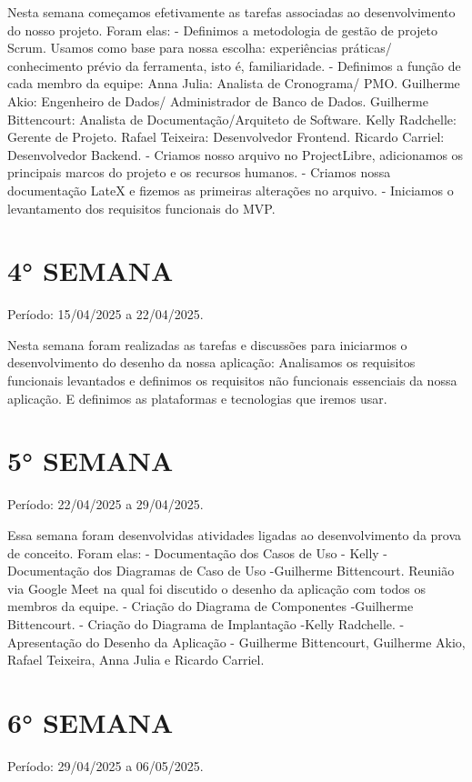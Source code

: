 \documentclass[
	12pt,				%
	openany,			%
	oneside,			%
	a4paper,			%
	english,			%
	french,				%
	spanish,			%
	brazil				%
	]{abntex2}
\begin{document}
\begin{apendicesenv}
Nesta semana começamos efetivamente as tarefas associadas ao desenvolvimento do nosso projeto. Foram elas:
- Definimos a metodologia de gestão de projeto Scrum. Usamos como base para  nossa escolha: experiências práticas/ conhecimento prévio da ferramenta, isto é, familiaridade. 
- Definimos a função de cada membro da equipe:
Anna Julia: Analista de Cronograma/ PMO.
Guilherme Akio: Engenheiro de Dados/ Administrador de Banco de Dados.
Guilherme Bittencourt: Analista de Documentação/Arquiteto de Software.
Kelly Radchelle: Gerente de Projeto.
Rafael Teixeira: Desenvolvedor Frontend.
Ricardo Carriel: Desenvolvedor Backend.
- Criamos nosso arquivo no ProjectLibre, adicionamos os principais marcos do projeto e os recursos humanos.
- Criamos nossa documentação LateX e fizemos as primeiras alterações no arquivo.
- Iniciamos o levantamento dos requisitos funcionais do MVP.


\section{4° SEMANA}
Período: 15/04/2025 a 22/04/2025.

Nesta semana foram realizadas as tarefas e discussões para iniciarmos o desenvolvimento do desenho da nossa aplicação:
Analisamos os requisitos funcionais levantados e definimos os requisitos não funcionais essenciais da nossa aplicação.
E definimos as plataformas e tecnologias que iremos usar.


\section{5° SEMANA}
Período: 22/04/2025 a 29/04/2025.

Essa semana foram desenvolvidas atividades ligadas ao desenvolvimento da prova de conceito. Foram elas:
- Documentação dos Casos de Uso - Kelly
- Documentação dos Diagramas de Caso de Uso -Guilherme Bittencourt.
Reunião via Google Meet na qual foi discutido o desenho da aplicação com todos os membros da equipe.
- Criação do Diagrama de Componentes -Guilherme Bittencourt.
- Criação do Diagrama de Implantação -Kelly Radchelle.
- Apresentação do Desenho da Aplicação - Guilherme Bittencourt, Guilherme Akio, Rafael Teixeira, Anna Julia e Ricardo Carriel.

\section{6° SEMANA}
Período: 29/04/2025 a 06/05/2025.


\end{apendicesenv}
\end{document}
